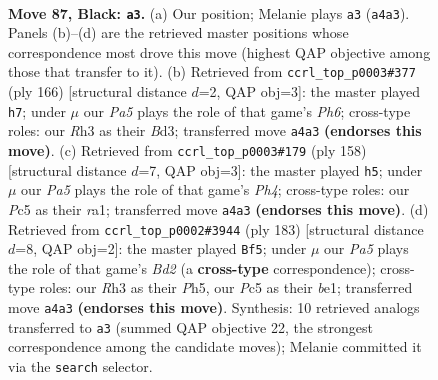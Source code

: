 \documentclass[11pt]{article}
\begin{document}
\clearpage

\begin{figure}[p]\centering
\begin{subfigure}{0.46\textwidth}\centering
\resizebox{\linewidth}{!}{%
\newchessgame
\chessboard[
  setfen={8/8/8/2p1k3/p2p4/7r/5K2/8 b - - 15 87},
  showmover=false,
  pgfstyle=straightmove, color=movearrow, markmove={a4-a3}
]}
\caption{}
\end{subfigure}\hfill
\begin{subfigure}{0.46\textwidth}\centering
\resizebox{\linewidth}{!}{%
\newchessgame
\chessboard[
  setfen={R7/8/7P/3k4/6P1/3B1P2/6K1/8 w - - 1 84},
  showmover=false,
  pgfstyle=straightmove, color=movearrow, markmove={h6-h7}
]}
\caption{}
\end{subfigure}
\\[4pt]
\begin{subfigure}{0.46\textwidth}\centering
\resizebox{\linewidth}{!}{%
\newchessgame
\chessboard[
  setfen={8/6k1/3R4/8/7P/5PK1/8/r7 w - - 15 80},
  showmover=false,
  pgfstyle=straightmove, color=movearrow, markmove={h4-h5}
]}
\caption{}
\end{subfigure}\hfill
\begin{subfigure}{0.46\textwidth}\centering
\resizebox{\linewidth}{!}{%
\newchessgame
\chessboard[
  setfen={8/3b4/8/4k2p/5p2/8/6K1/4B3 b - - 31 92},
  showmover=false,
  pgfstyle=straightmove, color=movearrow, markmove={d7-f5}
]}
\caption{}
\end{subfigure}
\caption{\textbf{Move 87, Black: \texttt{a3}.} (a) Our position; Melanie plays \texttt{a3} (\texttt{a4a3}). Panels (b)--(d) are the retrieved master positions whose correspondence most drove this move (highest QAP objective among those that transfer to it). (b) Retrieved from \texttt{ccrl\_top\_p0003\#377} (ply 166) [structural distance $d$=2, QAP obj=3]: the master played \texttt{h7}; under $\mu$ our \emph{Pa5} plays the role of that game's \emph{Ph6}; cross-type roles: our \emph{R}h3 as their \emph{B}d3; transferred move \texttt{a4a3} \textbf{(endorses this move)}. (c) Retrieved from \texttt{ccrl\_top\_p0003\#179} (ply 158) [structural distance $d$=7, QAP obj=3]: the master played \texttt{h5}; under $\mu$ our \emph{Pa5} plays the role of that game's \emph{Ph4}; cross-type roles: our \emph{P}c5 as their \emph{r}a1; transferred move \texttt{a4a3} \textbf{(endorses this move)}. (d) Retrieved from \texttt{ccrl\_top\_p0002\#3944} (ply 183) [structural distance $d$=8, QAP obj=2]: the master played \texttt{Bf5}; under $\mu$ our \emph{Pa5} plays the role of that game's \emph{Bd2} (a \textbf{cross-type} correspondence); cross-type roles: our \emph{R}h3 as their \emph{P}h5, our \emph{P}c5 as their \emph{b}e1; transferred move \texttt{a4a3} \textbf{(endorses this move)}. Synthesis: 10 retrieved analogs transferred to \texttt{a3} (summed QAP objective 22, the strongest correspondence among the candidate moves); Melanie committed it via the \texttt{search} selector.}
\label{fig:thought-m173}
\end{figure}
\end{document}
